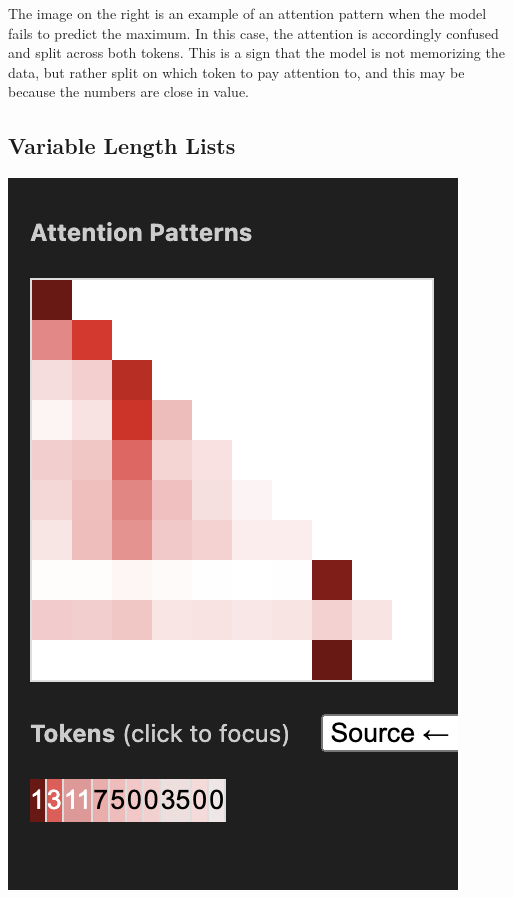 \documentclass{article}
\begin{document}
The image on the right is an example of an attention pattern when the model fails to predict the maximum. In this case, the attention is accordingly confused and split across both tokens. This is a sign that the model is not memorizing the data, but rather split on which token to pay attention to, and this may be because the numbers are close in value.

\subsection{Variable Length Lists}

\begin{center}
    \includegraphics[scale=0.4]{images/att_variable.png}

\end{center}
\end{document}
